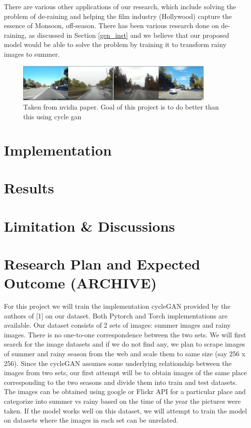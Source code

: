 \documentclass{article}
\begin{document}
There are various other applications of our research, which include 
solving the problem of de-raining and helping the film industry (Hollywood)
 capture the essence of Monsoon, off-season. There has been various research 
 done on de-raining, as discussed in Section \ref{gen_inst} and we believe that our 
 proposed model would be able to solve the problem by training it to 
 transform rainy images to summer.

 \begin{figure}[htb!]
  \centering
  \includegraphics[width=99mm]{image.png}
  \caption{Taken from nvidia paper. Goal of this project is to do better 
  than this using cycle gan \label{overflow}}
\end{figure}

\section{Implementation}

\section{Results}

\section{Limitation \& Discussions}

\section{Research Plan and Expected Outcome (ARCHIVE)}
\label{headings}

For this project we will train the implementation cycleGAN provided by the 
authors of [1] on our dataset. Both Pytorch and Torch implementations are 
available. Our dataset consists of 2 sets of images: summer images and 
rainy images. There is no one-to-one correspondence between the two sets. 
We will first search for the image datasets and if we do not find any, we 
plan to scrape images of summer and rainy season from the web and scale 
them to same size (say 256 x 256). Since the cycleGAN assumes some 
underlying relationship between the images from two sets, our first 
attempt will be to obtain images of the same place corresponding to the 
two seasons and divide them into train and test datasets. The images can
be obtained using google or Flickr API for a particular place and 
categorize into summer vs rainy based on the time of the year the 
pictures were taken. If the model works well on this dataset, we will 
attempt to train the model on datasets where the images in each set can 
be unrelated.
\end{document}
